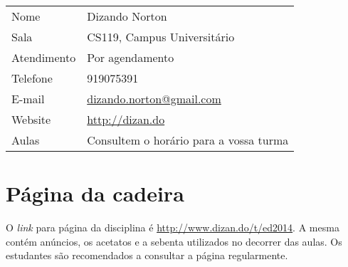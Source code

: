 \begin{table}[H]
	\begin{tabular}{ll}%
		Nome 			& Dizando Norton \\ 
	    Sala			& CS119, Campus Universitário	\\ 
	    Atendimento 	& Por agendamento \\
	    Telefone		& 919075391\\
	    E-mail			& \url{dizando.norton@gmail.com}\\
	    Website			& \url{http://dizan.do}\\
	    Aulas 			& Consultem o horário para a vossa turma\\
	\end{tabular}
\end{table}

\section*{Página da cadeira}


O \emph{link} para página da disciplina é \url{http://www.dizan.do/t/ed2014}. A mesma contém anúncios, os acetatos e a sebenta utilizados no 
decorrer das aulas. Os estudantes são recomendados a consultar a página regularmente.





